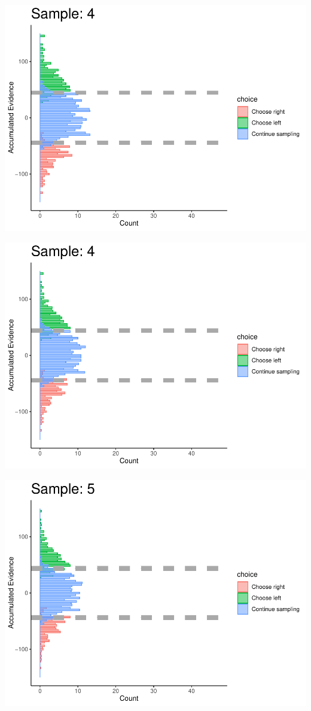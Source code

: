 \documentclass[
]{book}
\begin{document}
\begin{center}\includegraphics[width=0.8\linewidth]{LateNightBayes_files/figure-latex/collapsing_check-38} \end{center}

\begin{center}\includegraphics[width=0.8\linewidth]{LateNightBayes_files/figure-latex/collapsing_check-39} \end{center}

\begin{center}\includegraphics[width=0.8\linewidth]{LateNightBayes_files/figure-latex/collapsing_check-40} \end{center}
\end{document}
